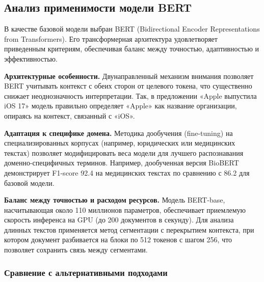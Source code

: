 \subsection{Анализ применимости модели BERT}

В качестве базовой модели выбран BERT (Bidirectional Encoder Representations from Transformers). Его трансформерная архитектура удовлетворяет приведенным критериям, обеспечивая баланс между точностью, адаптивностью и эффективностью.

\textbf{Архитектурные особенности.} Двунаправленный механизм внимания позволяет BERT учитывать контекст с обеих сторон от целевого токена, что существенно снижает неоднозначность интерпретации. Так, в предложении «Apple выпустила iOS 17» модель правильно определяет «Apple» как название организации, опираясь на контекст, связанный с «iOS».

\textbf{Адаптация к специфике домена.} Методика дообучения (fine-tuning) на специализированных корпусах (например, юридических или медицинских текстах) позволяет модифицировать веса модели для лучшего распознавания доменно-специфичных терминов. Например, дообученная версия BioBERT демонстрирует F1-score 92.4 на медицинских текстах по сравнению с 86.2 для базовой модели.

\textbf{Баланс между точностью и расходом ресурсов.} Модель BERT-base, насчитывающая около 110 миллионов параметров, обеспечивает приемлемую скорость инференса на GPU (до 200 документов в секунду). Для анализа длинных текстов применяется метод сегментации с перекрытием контекста, при котором документ разбивается на блоки по 512 токенов с шагом 256, что позволяет сохранить связь между сегментами.

\subsubsection{Сравнение с альтернативными подходами}

